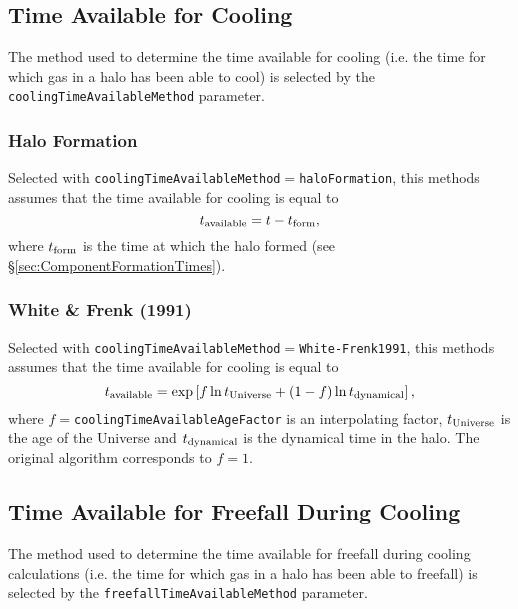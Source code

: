 \subsection{Time Available for Cooling}\label{sec:TimeAvailableCooling}

The method used to determine the time available for cooling (i.e. the time for which gas in a halo has been able to cool) is selected by the {\tt coolingTimeAvailableMethod} parameter.

\subsubsection{Halo Formation}

Selected with {\tt coolingTimeAvailableMethod}$=${\tt haloFormation}, this methods assumes that the time available for cooling is equal to
\begin{equation}
 t_{\rm available} = t - t_{\rm form},
\end{equation}
where $t_{\rm form}$ is the time at which the halo formed (see \S\ref{sec:ComponentFormationTimes}).

\subsubsection{White \& Frenk (1991)}

Selected with {\tt coolingTimeAvailableMethod}$=${\tt White-Frenk1991}, this methods assumes that the time available for cooling is equal to
\begin{equation}
 t_{\rm available} = \exp\left[ f \ln t_{\rm Universe} + (1-f)\ln t_{\rm dynamical} \right],
\end{equation}
where $f=${\tt coolingTimeAvailableAgeFactor} is an interpolating factor, $t_{\rm Universe}$ is the age of the Universe and $t_{\rm dynamical}$ is the dynamical time in the halo. The original \cite{white_galaxy_1991} algorithm corresponds to $f=1$.


\subsection{Time Available for Freefall During Cooling}\label{sec:TimeAvailableFreefall}

The method used to determine the time available for freefall during cooling calculations (i.e. the time for which gas in a halo has been able to freefall) is selected by the {\tt freefallTimeAvailableMethod} parameter.

